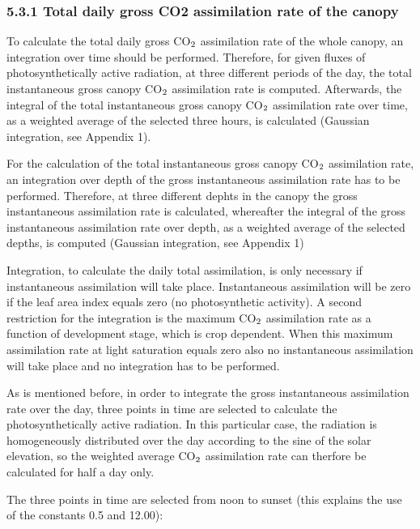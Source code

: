 \documentclass[11pt]{article}
\begin{document}
\bigskip
\bigskip

\subsubsection{  5.3.1 Total daily gross CO2 assimilation rate of the canopy  }

To calculate the total daily gross CO$_{{\rm 2}}$ assimilation rate of the whole canopy, an integra\-tion over time should be performed. Therefore, for given fluxes of photosyntheti\-cally
active radiation, at three different periods of the day, the total instantaneous gross canopy
CO$_{{\rm 2}}$ {\nobreak}assimila\-tion rate is computed. Afterwards, the integral of the total instantaneous
gross canopy CO$_{{\rm 2}}$ assimila\-tion rate over time, as a weighted average of the selected three
hours, is calculat\-ed (Gaussian integration, see Appendix 1).

For the calculation of the total instantaneous gross canopy CO$_{{\rm 2}}$ assimilation rate, an
integra\-tion over depth of the gross instantaneous assimilation rate has to be per\-formed.
Therefore, at three different dephts in the canopy the gross instanta\-neous assimilation rate
is calculated, whereafter the integral of the gross instantaneous assimila\-tion rate over
depth, as a weighted average of the selected depths, is computed (Gaussian integration,
see Appendix 1)

Integration, to calculate the daily total assimilation, is only necessary if instanta\-neous
assimilation will take place. Instanta\-neous assimila\-tion will be zero if the leaf area index
equals zero (no photosynthetic activity). A second restriction for the integration is the
maximum CO$_{{\rm 2}}$ assimilation rate as a function of development stage, which is crop
dependent. When this maxi\-mum assimila\-tion rate at light saturation equals zero also no
instantaneous assimila\-tion will take place and no integration has to be performed.

As is mentioned before, in order to integrate the gross instantaneous assimilation rate
over the day, three points in time are selected to calculate the photosynthetically active
radiation. In this particular case, the radiation is homogeneously distributed over the day
according to the sine of the solar elevation, so the weighted average CO$_{{\rm 2}}$ assimilation rate
can therfore be calculated for half a day only.

The three points in time are selected from noon to sunset (this explains the use of the
constants 0.5 and 12.00):
\end{document}
